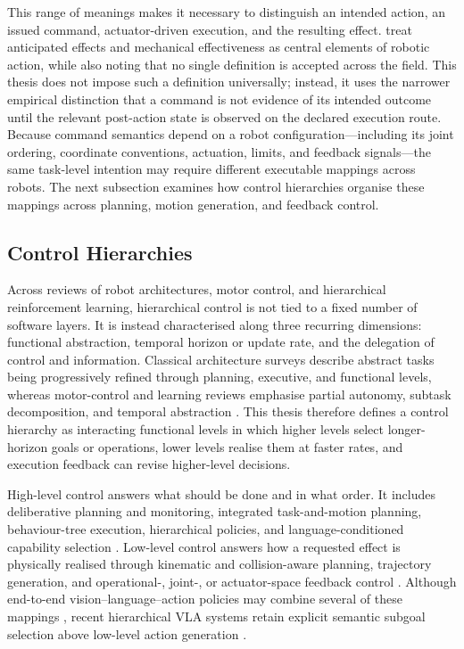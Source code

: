 This range of meanings makes it necessary to distinguish an intended action,
an issued command, actuator-driven execution, and the resulting effect.
\citet{zech2019action} treat anticipated effects and mechanical effectiveness
as central elements of robotic action, while also noting that no single
definition is accepted across the field. This thesis does not impose such a
definition universally; instead, it uses the narrower empirical distinction
that a command is not evidence of its intended outcome until the relevant
post-action state is observed on the declared execution route. Because command
semantics depend on a robot configuration---including its joint ordering,
coordinate conventions, actuation, limits, and feedback signals---the same
task-level intention may require different executable mappings across robots.
The next subsection examines how control hierarchies organise these mappings
across planning, motion generation, and feedback control.

\subsection{Control Hierarchies}
\label{sec:control-hierarchies}

Across reviews of robot architectures, motor control, and hierarchical
reinforcement learning, hierarchical control is not tied to a fixed number of
software layers. It is instead characterised along three recurring dimensions:
functional abstraction, temporal horizon or update rate, and the delegation of
control and information. Classical architecture surveys describe abstract
tasks being progressively refined through planning, executive, and functional
levels, whereas motor-control and learning reviews emphasise partial autonomy,
subtask decomposition, and temporal abstraction
\citep{medeiros1998architectures,merel2019hierarchical,
pateria2021hrlsurvey,acs2026longhorizon}. This thesis therefore defines a
control hierarchy as interacting functional levels in which higher levels
select longer-horizon goals or operations, lower levels realise them at faster
rates, and execution feedback can revise higher-level decisions.

High-level control answers what should be done and in what order. It includes
deliberative planning and monitoring, integrated task-and-motion planning,
behaviour-tree execution, hierarchical policies, and language-conditioned
capability selection
\citep{ingrand2017deliberation,garrett2021tamp,iovino2022btsurvey,
ahn2022saycan,liang2023codeaspolicies}. Low-level control answers how a
requested effect is physically realised through kinematic and collision-aware
planning, trajectory generation, and operational-, joint-, or actuator-space
feedback control
\citep{khatib1987unified,lynch2017modern,ijspeert2013dmp}. Although end-to-end
vision--language--action policies may combine several of these mappings
\citep{brohan2023rt2,black2024pi0}, recent hierarchical VLA systems retain
explicit semantic subgoal selection above low-level action generation
\citep{shi2025hirobot,hu2026orchestrating}.

